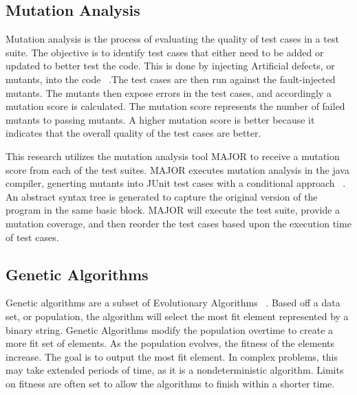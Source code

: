 \documentclass[conference]{IEEEtran}
\begin{document}
\subsection{Mutation Analysis}
Mutation analysis is the process of evaluating the quality of test cases in a test suite. The objective is to identify test cases that either need to be added or updated to better test the code. This is done by injecting Artificial defects, or mutants, into the code ~\cite{Fraser:2010:MGU:1831708.1831728}.The test cases are then run against the fault-injected mutants. The mutants then expose errors in the test cases, and accordingly a mutation score is calculated. The mutation score represents the number of failed mutants to passing mutants. A higher mutation score is better because it indicates that the overall quality of the test cases are better. 

This research utilizes the mutation analysis tool MAJOR to receive a mutation score from each of the test suites. MAJOR executes mutation analysis in the java compiler, generting mutants into JUnit test cases with a conditional approach ~\cite{MAJOR:Just:2011}. An abstract syntax tree is generated to capture the original version of the program in the same basic block. MAJOR will execute the test suite, provide a mutation coverage, and then reorder the test cases based upon the execution time of test cases. 

\subsection{Genetic Algorithms}
Genetic algorithms are a subset of Evolutionary Algorithms ~\cite{Pandey:2012:GAC:2381716.2381766}.  Based off a data set, or population, the algorithm will select the most fit element represented by a binary string. Genetic Algorithms modify the population overtime to create a more fit set of elements. As the population evolves, the fitness of the elements increase. The goal is to output the most fit element. In complex problems, this may take extended periods of time, as it is a nondeterministic algorithm. Limits on fitness are often set to allow the algorithms to finish within a shorter time.
\end{document}
